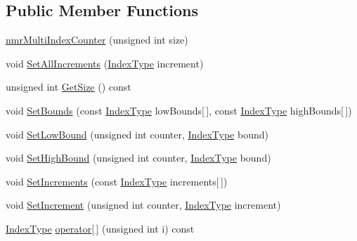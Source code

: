 \subsection*{Public Member Functions}
\begin{DoxyCompactItemize}
\item 
\hyperlink{classnmr_multi_index_counter_a383941c773814589d6ad04ba83edf71c}{nmr\+Multi\+Index\+Counter} (unsigned int size)
\item 
void \hyperlink{classnmr_multi_index_counter_af1bb384088b5b39cf86815c0f4c0d26a}{Set\+All\+Increments} (\hyperlink{classnmr_multi_index_counter_a0632b941a7d18df347174b4345d73d01}{Index\+Type} increment)
\item 
unsigned int \hyperlink{classnmr_multi_index_counter_ab6fe790ac273d6bb17bec5ba8c67154e}{Get\+Size} () const 
\item 
void \hyperlink{classnmr_multi_index_counter_af0acb59056271a7972422ec9cb27801c}{Set\+Bounds} (const \hyperlink{classnmr_multi_index_counter_a0632b941a7d18df347174b4345d73d01}{Index\+Type} low\+Bounds\mbox{[}$\,$\mbox{]}, const \hyperlink{classnmr_multi_index_counter_a0632b941a7d18df347174b4345d73d01}{Index\+Type} high\+Bounds\mbox{[}$\,$\mbox{]})
\item 
void \hyperlink{classnmr_multi_index_counter_a88d5e34b5cc436822b87c0f1d64a9e71}{Set\+Low\+Bound} (unsigned int counter, \hyperlink{classnmr_multi_index_counter_a0632b941a7d18df347174b4345d73d01}{Index\+Type} bound)
\item 
void \hyperlink{classnmr_multi_index_counter_a03edb8a4ca7e8f4286be1aa0ad313888}{Set\+High\+Bound} (unsigned int counter, \hyperlink{classnmr_multi_index_counter_a0632b941a7d18df347174b4345d73d01}{Index\+Type} bound)
\item 
void \hyperlink{classnmr_multi_index_counter_a9d1f352f2afdf36d09192fa6bfacf74c}{Set\+Increments} (const \hyperlink{classnmr_multi_index_counter_a0632b941a7d18df347174b4345d73d01}{Index\+Type} increments\mbox{[}$\,$\mbox{]})
\item 
void \hyperlink{classnmr_multi_index_counter_aceecc9513b02feb8e661cd646bf4a6da}{Set\+Increment} (unsigned int counter, \hyperlink{classnmr_multi_index_counter_a0632b941a7d18df347174b4345d73d01}{Index\+Type} increment)
\item 
\hyperlink{classnmr_multi_index_counter_a0632b941a7d18df347174b4345d73d01}{Index\+Type} \hyperlink{classnmr_multi_index_counter_a12dcd653706590b99922d5a3201e185b}{operator\mbox{[}$\,$\mbox{]}} (unsigned int i) const 
\item 

\end{DoxyCompactItemize}

